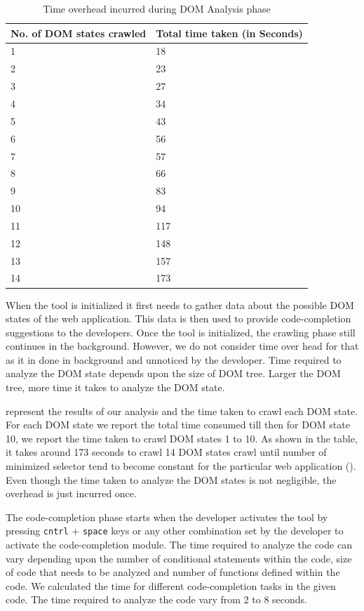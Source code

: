 		\begin{table}
	{
		\scriptsize
		\begin{tabular}{ p{3.8cm} | p{3.8cm}}
  			\hline                        
  			\textbf{No. of DOM states crawled} & \textbf{Total time taken (in Seconds)} \\ \hline \hline
  			1 & 18  \\ \hline
			2 & 23 \\ \hline
			3 & 27  \\ \hline
			4 & 34  \\ \hline
			5 & 43  \\ \hline
			6 & 56  \\ \hline
			7 & 57  \\ \hline
			8 & 66  \\ \hline
			9 & 83  \\ \hline
			10 & 94  \\ \hline
			11 & 117  \\ \hline
			12 & 148  \\ \hline
			13 & 157  \\ \hline
			14 & 173  \\ \hline
			\hline  
		\end{tabular}
	}
	\caption {Time overhead incurred during DOM Analysis phase}
	\label{Table:Time}		
	\end{table}
	When the \dompletion tool is initialized it first needs to gather data about the possible DOM states of the web application. This data is then used to provide code-completion suggestions to the developers. Once the tool is initialized, the crawling phase still continues in the background. However, we do not consider time over head for that as it in done in background and unnoticed by the developer. Time required to analyze the DOM state depends upon the size of DOM tree. Larger the DOM tree, more time it takes to analyze the DOM state.
	
	 represent the results of our analysis and the time taken to crawl each DOM state. For each DOM state we report the total time consumed till then \ie for DOM state 10, we report the time taken to crawl DOM states 1 to 10. As shown in the table, it takes around 173 seconds to crawl 14 DOM states \ie crawl until number of minimized \css selector tend to become constant for the particular web application (). Even though the time taken to analyze the DOM states is not negligible, the overhead is just incurred once. 
	
	The code-completion phase starts when the developer activates the tool by pressing \texttt{cntrl} + \texttt{space} keys or any other combination set by the developer to activate the code-completion module. The time required to analyze the code can vary depending upon the number of conditional statements within the code, size of code that needs to be analyzed and number of functions defined within the code. We calculated the time for different code-completion tasks in the given \javascript code. The time required to analyze the code vary from 2 to 8 seconds.
	
	
